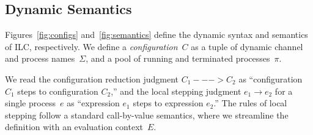 \begin{comment}
The fork rule says that that if we can appropriately split the affine context
such that the child process $e_1$ has type $A$ and mode $m_1$ and the
``continue'' process $e_2$ has type $B$ and mode $m_2$, then the whole
expression has type $B$ and mode $m_3$, which is derived by composing $m_1$ and
$m_2$ in parallel. Again, we emphasize that composing two write mode processes
in parallel violates type checking, i.e., $\Wm ;; \Wm => p$ cannot be derived
for any mode $p$.

Finally, the choice rule says that if we can appropriately split the affine
context such that both subexpressions $A$ and mode $R$, then the whole
expression follows exactly.

\paragraph{Affine rules.} The affine typing rules are, for the most part, analagous to their
intuitionistic counterparts. Two differences bear mentioning. First, the bang!
rule only lifts intuitionistically typed expressions that are closed with
respect to affine variables into an affinely typed expression. Otherwise, one
could wrap an intuitionistically typed expression with free affine variables in
a bang! and use it in an unrestricted manner. Second, in contrast with the abs
rule, the lollipop rule does not require function bodies to be free with respect
to affine variables.
\end{comment}

\subsection{Dynamic Semantics}
\label{subsec:semantics}

Figures~\ref{fig:configs} and~\ref{fig:semantics} define the dynamic syntax and
semantics of ILC, respectively.
%
We define a \emph{configuration}~$C$ as a tuple of
dynamic channel and process names~$\Sigma$, and a pool of running and terminated
processes~$\pi$.

We read the configuration reduction judgment $C_1 ---> C_2$ as ``configuration
$C_1$ steps to configuration $C_2$,'' 
%
and the local stepping judgment $e_1 \longrightarrow e_2$ for a single process~$e$ as
``expression $e_1$ steps to expression $e_2$.''
%
The rules of local stepping follow a standard call-by-value semantics, 
where we streamline the definition with an evaluation context~$E$.

